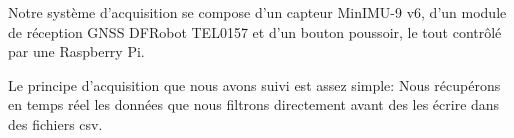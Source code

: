 Notre système d'acquisition se compose d'un capteur MinIMU-9 v6,
d'un module de réception GNSS DFRobot TEL0157 et d'un bouton poussoir, le tout contrôlé par une Raspberry Pi.

Le principe d'acquisition que nous avons suivi est assez simple:
Nous récupérons en temps réel les données que nous filtrons directement avant des les écrire dans des fichiers csv.
